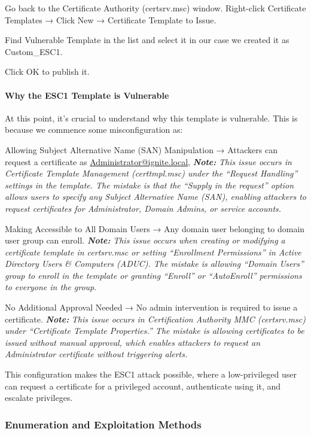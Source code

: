 Go back to the Certificate Authority (certsrv.msc) window. Right-click Certificate Templates → Click New → Certificate Template to Issue.

Find Vulnerable Template in the list and select it in our case we created it as Custom\_ESC1.

Click OK to publish it.

\paragraph{Why the ESC1 Template is Vulnerable}

At this point, it’s crucial to understand why this template is vulnerable. This is because we commence some misconfiguration as:

Allowing Subject Alternative Name (SAN) Manipulation → Attackers can request a certificate as \href{mailto:Administrator@ignite.local}{Administrator@ignite.local},
\textbf{\textit{Note:}} \textit{This issue occurs in Certificate Template Management (certtmpl.msc) under the “Request Handling” settings in the template. The mistake is that the “Supply in the request” option allows users to specify any Subject Alternative Name (SAN), enabling attackers to request certificates for Administrator, Domain Admins, or service accounts.}

Making Accessible to All Domain Users → Any domain user belonging to domain user group can enroll.
\textbf{\textit{Note:}} \textit{This issue occurs when creating or modifying a certificate template in certsrv.msc or setting “Enrollment Permissions” in Active Directory Users \& Computers (ADUC). The mistake is allowing “Domain Users” group to enroll in the template or granting “Enroll” or “AutoEnroll” permissions to everyone in the group}.

No Additional Approval Needed → No admin intervention is required to issue a certificate.
\textbf{\textit{Note:}} \textit{This issue occurs in Certification Authority MMC (certsrv.msc) under “Certificate Template Properties.” The mistake is allowing certificates to be issued without manual approval, which enables attackers to request an Administrator certificate without triggering alerts.}

This configuration makes the ESC1 attack possible, where a low-privileged user can request a certificate for a privileged account, authenticate using it, and escalate privileges.

\subsubsection{Enumeration and Exploitation Methods}

